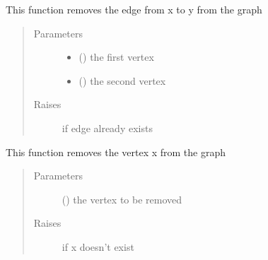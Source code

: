 \documentclass[letterpaper,10pt,english]{sphinxmanual}
\begin{document}
\begin{fulllineitems}
\begin{fulllineitems}
\label{\detokenize{UndirectedGraph:UndirectedGraph.UndirectedGraph.remove_edge}}
This function removes the edge from x to y from the graph
\begin{quote}\begin{description}
\item[{Parameters}] \leavevmode\begin{itemize}
\item {} 
 () \textendash{} the first vertex

\item {} 
 () \textendash{} the second vertex

\end{itemize}

\item[{Raises}] \leavevmode
{} \textendash{} if edge already exists

\end{description}\end{quote}

\end{fulllineitems}


\begin{fulllineitems}
\label{\detokenize{UndirectedGraph:UndirectedGraph.UndirectedGraph.remove_vertex}}
This function removes the vertex x from the graph
\begin{quote}\begin{description}
\item[{Parameters}] \leavevmode
{} () \textendash{} the vertex to be removed

\item[{Raises}] \leavevmode
{} \textendash{} if x doesn’t exist

\end{description}\end{quote}

\end{fulllineitems}


\end{fulllineitems}
\end{document}
